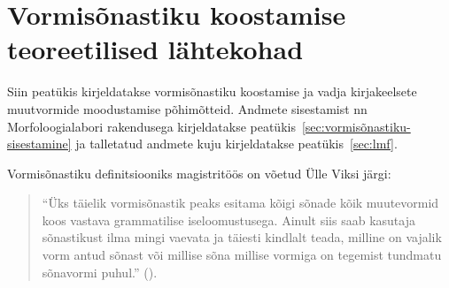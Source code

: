 \documentclass[12pt,a4paper]{article}
\begin{document}










\newpage
\section{Vormisõnastiku koostamise teoreetilised lähtekohad}
\label{teoreetilised-lähtekohad}

Siin peatükis kirjeldatakse vormisõnastiku koostamise ja vadja kirjakeelsete muutvormide moodustamise põhimõtteid. Andmete sisestamist nn Morfoloogia\-labori rakendusega kirjeldatakse peatükis~\ref{sec:vormisõnastiku-sisestamine} ja talletatud andmete kuju kirjeldatakse peatükis~\ref{sec:lmf}.

Vormisõnastiku definitsiooniks magistritöös on võetud Ülle Viksi järgi:

\begin{quote}
  \enquote{Üks täielik vormisõnastik peaks esitama kõigi sõnade kõik muutevormid koos vastava grammatilise iseloomustusega. Ainult siis saab kasutaja sõnastikust ilma mingi vaevata ja täiesti kindlalt teada, milline on vajalik vorm antud sõnast või millise sõna millise vormiga on tegemist tundmatu sõnavormi puhul.} (\cite[7]{viks_vaike_1992}).
\end{quote}
\end{document}
